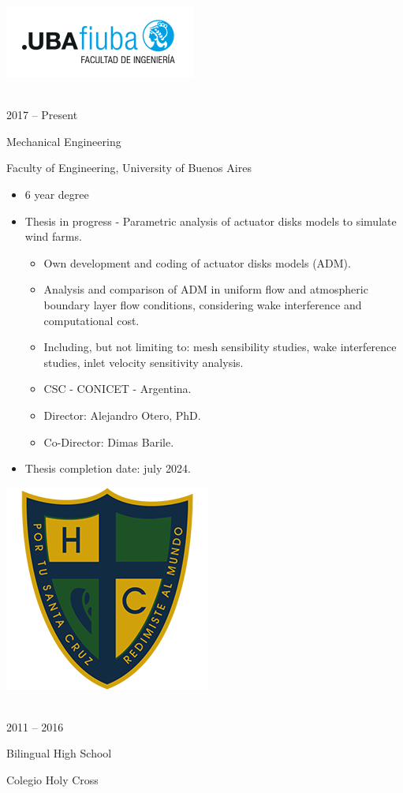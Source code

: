 \documentclass[a4paper,10pt]{article}
\newlength{\cvcolumngapwidth}
\newlength{\cvleftcolumnwidth}
\newlength{\cvrightcolumnwidth}
\newcommand{\cvtitlestyle}[1]{{\large\cvtitlefont\textcolor{cvtitlecolor}{#1}}}
\newcommand{\cvdurationstyle}[1]{{\small\cvdurationfont\textcolor{cvdurationcolor}{#1}}}
\newlength{\cvafteritemskipamount}
\newlength{\cvaftertitleskipamount}
\newlength{\cvparskip}
\newcommand{\cvitem}[2]{
    \begin{minipage}[t]{\cvleftcolumnwidth}
        \raggedleft #1
    \end{minipage}%
    \hspace{\cvcolumngapwidth}%
    \begin{minipage}[t]{\cvrightcolumnwidth}
        \setlength{\parskip}{\cvparskip} #2
    \end{minipage}

    \vspace{\cvafteritemskipamount}
}
\newcommand{\cvtitle}[1]{
    \cvtitlestyle{#1}

    \vspace{\cvaftertitleskipamount}
    \vspace{-\cvparskip}
}
\begin{document}
\cvitem{
 	\begin{minipage}{\textwidth}
   \begin{flushright}
		  \includegraphics[height=0.25\textwidth]{../logos-photos/Logo_FIUBA_new.png}   
    \end{flushright}  
  \end{minipage} \\
  \vspace{0.1cm}
  \cvdurationstyle{2017 -- Present}
}{
  \cvtitle{Mechanical Engineering}

    Faculty of Engineering, University of Buenos Aires
    
    \begin{itemize}[leftmargin=*]
      \item 6 year degree
      \item \textsf{Thesis in progress - Parametric analysis of actuator disks models to simulate wind farms.} 
        \begin{itemize}
          \item Own development and coding of actuator disks models (ADM).
          \item Analysis and comparison of ADM in uniform flow and atmospheric boundary layer flow conditions,
            considering wake interference and computational cost. 
          \item Including, but not limiting to: mesh sensibility studies, wake interference
            studies, inlet velocity sensitivity analysis.
          \item CSC - CONICET - Argentina.
          \item Director: Alejandro Otero, PhD.
          \item Co-Director: Dimas Barile.
        \end{itemize}
        \item Thesis completion date: july 2024.
    \end{itemize}
}


\cvitem{
    \begin{minipage}{\textwidth}
        \flushright
        \includegraphics[height=0.2\textwidth]{../logos-photos/Logo_HC.png}   
    \end{minipage}\\  
    \vspace{0.1cm}
    \cvdurationstyle{2011 -- 2016}
}{
    \cvtitle{Bilingual High School}

    Colegio Holy Cross
}
\end{document}
